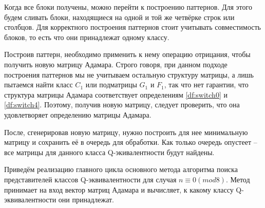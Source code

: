 \documentclass[a4paper, 14pt]{extreport}
\begin{document}
Когда все блоки получены, можно перейти к построению паттернов. Для этого будем сливать блоки, находящиеся на одной и той же четвёрке строк или столбцов. Для корректного построения паттернов стоит учитывать совместимость блоков, то есть что они принадлежат одному классу.

Построив паттерн, необходимо применить к нему операцию отрицания, чтобы получить новую матрицу Адамара. Строго говоря, при данном подходе построения паттернов мы не учитываем остальную структуру матрицы, а лишь пытаемся найти класс $C_1$ или подматрицы $G_1$ и $F_1$, так что нет гарантии, что структура матрицы Адамара соответствует определениям \ref{df:switch0} и \ref{df:switch4}. Поэтому, получив новую матрицу, следует проверить, что она удовлетворяет определению матрицы Адамара.

После, сгенерировав новую матрицу, нужно построить для нее минимальную матрицу и сохранить её в очередь для обработки. Как только очередь опустеет -- все матрицы для данного класса Q-экивалентности будут найдены.

Приведём реализацию главного цикла основного метода алгоритма поиска представителей классов Q-эквивалентности для случая $n \equiv 0(mod8)$. Метод принимает на вход вектор матриц Адамара и вычисляет, к какому классу Q-эквивалентности они принадлежат.
\end{document}

